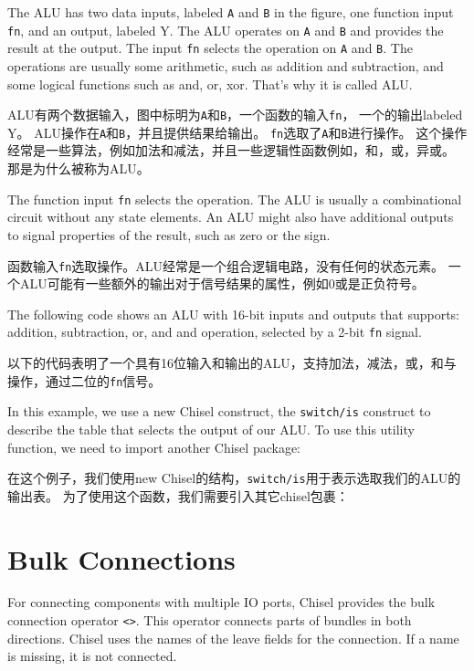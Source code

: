 \documentclass[%
    10pt,
    headinclude, footexclude,
    openright, %
    notitlepage,
    cleardoubleempty,
    headsepline,
    pointlessnumbers,
    bibtotoc, idxtotoc,
    ]{scrbook}
\newcommand{\code}[1]{{\small{\texttt{#1}}}}
\begin{document}
The ALU has two data inputs, labeled \code{A} and \code{B} in the figure, one function input \code{fn},
and an output, labeled {Y}. The ALU operates on \code{A} and \code{B} and provides the result
at the output. The input \code{fn} selects the operation on \code{A} and \code{B}.
The operations are usually some arithmetic, such as addition and subtraction, and some logical
functions such as and, or, xor. That's why it is called ALU.

ALU有两个数据输入，图中标明为\code{A}和\code{B}，一个函数的输入\code{fn}，
一个的输出labeled {Y}。 ALU操作在\code{A}和\code{B}，并且提供结果给输出。
\code{fn}选取了\code{A}和\code{B}进行操作。
这个操作经常是一些算法，例如加法和减法，并且一些逻辑性函数例如，和，或，异或。
那是为什么被称为ALU。

The function input \code{fn} selects the operation. The ALU is usually a combinational
circuit without any state elements. An ALU might also have additional outputs to signal properties
of the result, such as zero or the sign.

函数输入\code{fn}选取操作。ALU经常是一个组合逻辑电路，没有任何的状态元素。
一个ALU可能有一些额外的输出对于信号结果的属性，例如0或是正负符号。

The following code shows an ALU with 16-bit inputs and outputs that supports: addition, subtraction, or, and and
operation, selected by a 2-bit \code{fn} signal.

以下的代码表明了一个具有16位输入和输出的ALU，支持加法，减法，或，和与操作，通过二位的\code{fn}信号。


\noindent In this example, we use a new Chisel construct, the \code{switch/is} construct to describe
the table that selects the output of our ALU.
To use this utility function, we need to import another Chisel package:

\noindent 在这个例子，我们使用new Chisel的结构，\code{switch/is}用于表示选取我们的ALU的输出表。
为了使用这个函数，我们需要引入其它chisel包裹：


\section{Bulk Connections}

For connecting components with multiple IO ports, Chisel provides the
bulk connection operator \code{<>}. This operator connects parts of bundles
in both directions. Chisel uses the names of the leave fields for the connection.
If a name is missing, it is not connected.
\end{document}
